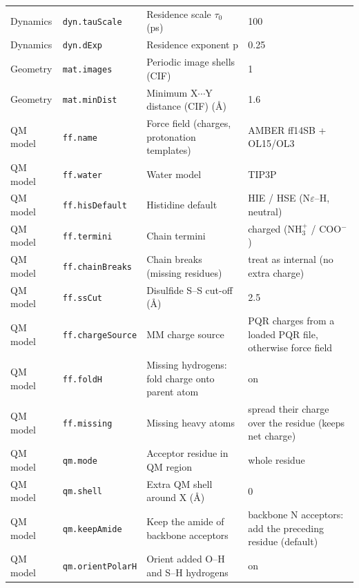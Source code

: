 {\begin{longtable}{llp{4.2cm}l}
Dynamics & \texttt{dyn.tauScale} & Residence scale $\tau_0$ (ps) & \parbox[t]{5.0cm}{\raggedright 100}\\
Dynamics & \texttt{dyn.dExp} & Residence exponent p & \parbox[t]{5.0cm}{\raggedright 0.25}\\
Geometry & \texttt{mat.images} & Periodic image shells (CIF) & \parbox[t]{5.0cm}{\raggedright 1}\\
Geometry & \texttt{mat.minDist} & Minimum X$\cdots$Y distance (CIF) (\AA{}) & \parbox[t]{5.0cm}{\raggedright 1.6}\\
QM model & \texttt{ff.name} & Force field (charges, protonation templates) & \parbox[t]{5.0cm}{\raggedright AMBER ff14SB + OL15/OL3}\\
QM model & \texttt{ff.water} & Water model & \parbox[t]{5.0cm}{\raggedright TIP3P}\\
QM model & \texttt{ff.hisDefault} & Histidine default & \parbox[t]{5.0cm}{\raggedright HIE / HSE (N$\varepsilon$--H, neutral)}\\
QM model & \texttt{ff.termini} & Chain termini & \parbox[t]{5.0cm}{\raggedright charged (NH$_3^+$ / COO$^-$)}\\
QM model & \texttt{ff.chainBreaks} & Chain breaks (missing residues) & \parbox[t]{5.0cm}{\raggedright treat as internal (no extra charge)}\\
QM model & \texttt{ff.ssCut} & Disulfide S--S cut-off (\AA{}) & \parbox[t]{5.0cm}{\raggedright 2.5}\\
QM model & \texttt{ff.chargeSource} & MM charge source & \parbox[t]{5.0cm}{\raggedright PQR charges from a loaded PQR file, otherwise force field}\\
QM model & \texttt{ff.foldH} & Missing hydrogens: fold charge onto parent atom & \parbox[t]{5.0cm}{\raggedright on}\\
QM model & \texttt{ff.missing} & Missing heavy atoms & \parbox[t]{5.0cm}{\raggedright spread their charge over the residue (keeps net charge)}\\
QM model & \texttt{qm.mode} & Acceptor residue in QM region & \parbox[t]{5.0cm}{\raggedright whole residue}\\
QM model & \texttt{qm.shell} & Extra QM shell around X (\AA{}) & \parbox[t]{5.0cm}{\raggedright 0}\\
QM model & \texttt{qm.keepAmide} & Keep the amide of backbone acceptors & \parbox[t]{5.0cm}{\raggedright backbone N acceptors: add the preceding residue (default)}\\
QM model & \texttt{qm.orientPolarH} & Orient added O--H and S--H hydrogens & \parbox[t]{5.0cm}{\raggedright on}\\

\end{longtable}}
